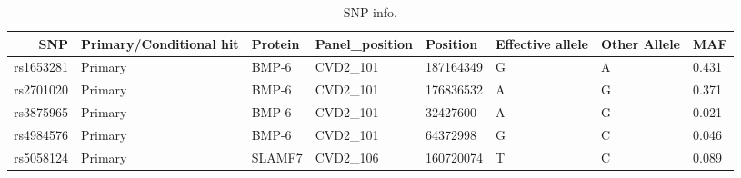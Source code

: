 \begin{table}[ht]
\centering
\begin{tabular}{rlllllll}
  \hline
  SNP       &  Primary/Conditional hit & Protein & Panel\_position & Position  & Effective allele & Other Allele & MAF \\
  \hline
  rs1653281 &  Primary                 & BMP-6   & CVD2\_101       & 187164349 & G                & A            & 0.431 \\
  rs2701020 &  Primary                 & BMP-6   & CVD2\_101       & 176836532 & A                & G            & 0.371 \\
  rs3875965 &  Primary                 & BMP-6   & CVD2\_101       & 32427600  & A                & G            & 0.021 \\
  rs4984576 &  Primary                 & BMP-6   & CVD2\_101       & 64372998  & G                & C            & 0.046 \\
  rs5058124 &  Primary                 & SLAMF7  & CVD2\_106       & 160720074 & T                & C            & 0.089 \\
  \hline
\end{tabular}
\caption{
  SNP info.
} 
\label{tab:snp_info}
\end{table}
